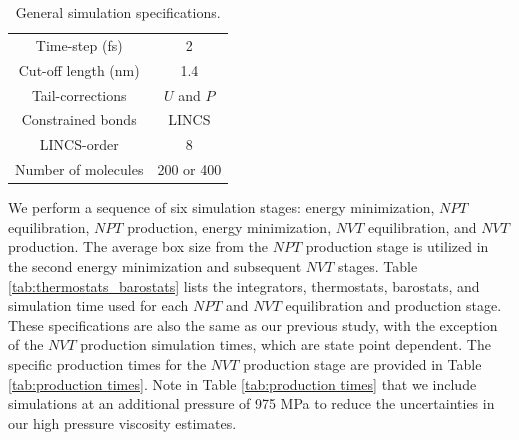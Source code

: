 \documentclass[preprint,review,12pt]{elsarticle}
\begin{document}
	 
	\begin{table}[htb!]
		\caption{General simulation specifications.} \label{tab:sim_specs}
		\begin{center}
			\begin{tabular}{|c|c|}
				\hline
				Time-step (fs) & 2 \\
				Cut-off length (nm) & 1.4 \\
				Tail-corrections & $U$ and $P$ \\
				Constrained bonds & LINCS \\
				LINCS-order & 8 \\			     
				Number of molecules & 200 or 400 \\
				\hline        
			\end{tabular}
		\end{center}
	\end{table}

	We perform a sequence of six simulation stages: energy minimization, $NPT$ equilibration, $NPT$ production, energy minimization, $NVT$ equilibration, and $NVT$ production. The average box size from the $NPT$ production stage is utilized in the second energy minimization and subsequent $NVT$ stages. Table \ref{tab:thermostats_barostats} lists the integrators, thermostats, barostats, and simulation time used for each $NPT$ and $NVT$ equilibration and production stage. These specifications are also the same as our previous study, with the exception of the $NVT$ production simulation times, which are state point dependent. The specific production times for the $NVT$ production stage are provided in Table \ref{tab:production times}. Note in Table \ref{tab:production times} that we include simulations at an additional pressure of 975 MPa to reduce the uncertainties in our high pressure viscosity estimates. 
	
\end{document}
